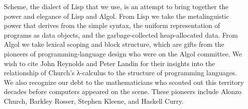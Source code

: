Scheme, the dialect of Lisp that we use, is an attempt to bring together the power and elegance of Lisp and Algol.
From Lisp we take the metalinguistic power that derives from the simple syntax, the uniform representation of programs as data objects, and the garbage-collected heap-allocated data.
From Algol we take lexical scoping and block structure, which are gifts from the pioneers of programming-language design who were on the Algol committee.
We wish to cite John Reynolds and Peter Landin for their insights into the relationship of Church’s λ-calculus to the structure of programming languages.
We also recognize our debt to the mathematicians who scouted out this territory decades before computers appeared on the scene.
These pioneers include Alonzo Church, Barkley Rosser, Stephen Kleene, and Haskell Curry.
